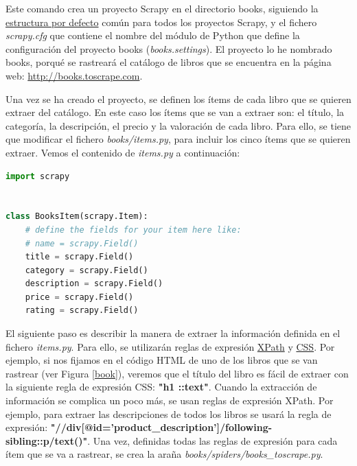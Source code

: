 \documentclass{uimppracticas}
\begin{document}
Este comando crea un proyecto Scrapy en el directorio books, siguiendo la \href{https://docs.scrapy.org/en/latest/topics/commands.html#default-structure-of-scrapy-projects}{estructura por defecto} común para todos los proyectos Scrapy, y el fichero \textit{scrapy.cfg} que contiene el nombre del módulo de Python que define la configuración del proyecto books (\textit{books.settings}). El proyecto lo he nombrado books, porqué se rastreará el catálogo de libros que se encuentra en la página web: \url{http://books.toscrape.com}.

Una vez se ha creado el proyecto, se definen los ítems de cada libro que se quieren extraer del catálogo. En este caso los ítems que se van a extraer son: el título, la categoría, la descripción, el precio y la valoración de cada libro. Para ello, se tiene que modificar el fichero \textit{books/items.py}, para incluir los cinco ítems que se quieren extraer. Vemos el contenido de \textit{items.py} a continuación:

\begin{lstlisting}[language=python]
import scrapy


class BooksItem(scrapy.Item):
	# define the fields for your item here like:
	# name = scrapy.Field()
	title = scrapy.Field()
	category = scrapy.Field()
	description = scrapy.Field()
	price = scrapy.Field()
	rating = scrapy.Field()
\end{lstlisting}

El siguiente paso es describir la manera de extraer la información definida en el fichero \textit{items.py}. Para ello, se utilizarán reglas de expresión \href{https://www.w3.org/TR/xpath/all/}{XPath} y \href{https://www.w3.org/TR/selectors/}{CSS}. Por ejemplo, si nos fijamos en el código HTML de uno de los libros que se van rastrear (ver Figura \ref{book}), veremos que el título del libro es fácil de extraer con la siguiente regla de expresión CSS: \textbf{"h1 ::text"}. Cuando la extracción de información se complica un poco más, se usan reglas de expresión XPath. Por ejemplo, para extraer las descripciones de todos los libros se usará la regla de expresión: \textbf{"//div[@id='product\_description']/following-sibling::p/text()"}. Una vez, definidas todas las reglas de expresión para cada ítem que se va a rastrear, se crea la araña \textit{books/spiders/books\_toscrape.py}.
\end{document}
